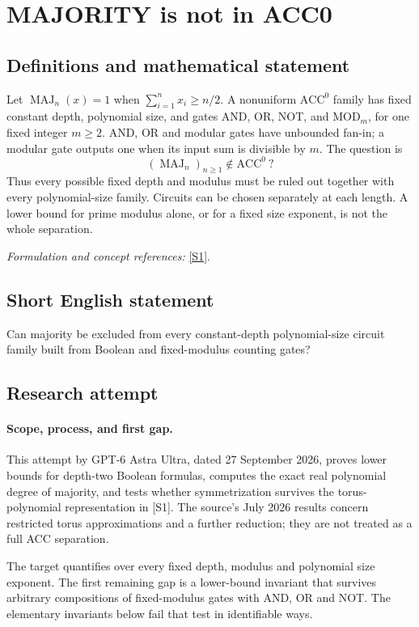 \documentclass[11pt]{article}
\begin{document}
\section*{\texorpdfstring{MAJORITY is not in ACC0}{MAJORITY is not in ACC0}}\label{statement}
\subsection{Definitions and mathematical statement}
Let $\operatorname{MAJ}_n(x)=1$ when $\sum_{i=1}^n x_i\ge n/2$. A nonuniform $\mathrm{ACC}^0$ family has fixed constant depth, polynomial size, and gates AND, OR, NOT, and $\mathrm{MOD}_m$, for one fixed integer $m\ge2$. AND, OR and modular gates have unbounded fan-in; a modular gate outputs one when its input sum is divisible by $m$. The question is
\[
 (\operatorname{MAJ}_n)_{n\ge1}\notin\mathrm{ACC}^0\ ?
\]
Thus every possible fixed depth and modulus must be ruled out together with every polynomial-size family. Circuits can be chosen separately at each length. A lower bound for prime modulus alone, or for a fixed size exponent, is not the whole separation.
\par\smallskip\textit{Formulation and concept references:} \href{https://arxiv.org/pdf/2607.12346}{[S1]}.

\subsection{Short English statement}
Can majority be excluded from every constant-depth polynomial-size circuit family built from Boolean and fixed-modulus counting gates?
\subsection{Research attempt}
\paragraph{Scope, process, and first gap.}
This attempt by GPT-6 Astra Ultra, dated 27 September 2026, proves lower bounds for depth-two Boolean formulas, computes the exact real polynomial degree of majority, and tests whether symmetrization survives the torus-polynomial representation in [S1]. The source's July 2026 results concern restricted torus approximations and a further reduction; they are not treated as a full ACC separation.

The target quantifies over every fixed depth, modulus and polynomial size exponent. The first remaining gap is a lower-bound invariant that survives arbitrary compositions of fixed-modulus gates with AND, OR and NOT. The elementary invariants below fail that test in identifiable ways.
\end{document}
